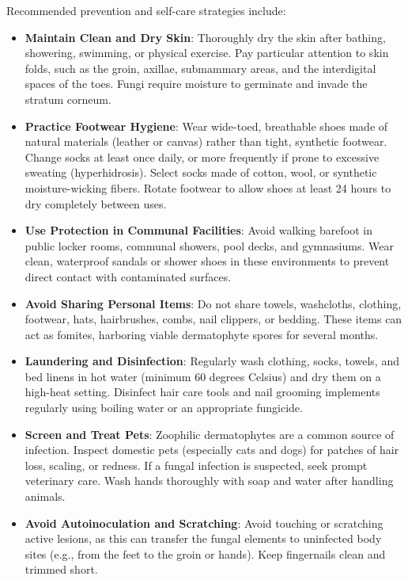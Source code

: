 Recommended prevention and self-care strategies include:
\begin{itemize}
    \item \textbf{Maintain Clean and Dry Skin}: Thoroughly dry the skin after bathing, showering, swimming, or physical exercise. Pay particular attention to skin folds, such as the groin, axillae, submammary areas, and the interdigital spaces of the toes. Fungi require moisture to germinate and invade the stratum corneum.
    \item \textbf{Practice Footwear Hygiene}: Wear wide-toed, breathable shoes made of natural materials (leather or canvas) rather than tight, synthetic footwear. Change socks at least once daily, or more frequently if prone to excessive sweating (hyperhidrosis). Select socks made of cotton, wool, or synthetic moisture-wicking fibers. Rotate footwear to allow shoes at least 24 hours to dry completely between uses.
    \item \textbf{Use Protection in Communal Facilities}: Avoid walking barefoot in public locker rooms, communal showers, pool decks, and gymnasiums. Wear clean, waterproof sandals or shower shoes in these environments to prevent direct contact with contaminated surfaces.
    \item \textbf{Avoid Sharing Personal Items}: Do not share towels, washcloths, clothing, footwear, hats, hairbrushes, combs, nail clippers, or bedding. These items can act as fomites, harboring viable dermatophyte spores for several months.
    \item \textbf{Laundering and Disinfection}: Regularly wash clothing, socks, towels, and bed linens in hot water (minimum 60 degrees Celsius) and dry them on a high-heat setting. Disinfect hair care tools and nail grooming implements regularly using boiling water or an appropriate fungicide.
    \item \textbf{Screen and Treat Pets}: Zoophilic dermatophytes are a common source of infection. Inspect domestic pets (especially cats and dogs) for patches of hair loss, scaling, or redness. If a fungal infection is suspected, seek prompt veterinary care. Wash hands thoroughly with soap and water after handling animals.
    \item \textbf{Avoid Autoinoculation and Scratching}: Avoid touching or scratching active lesions, as this can transfer the fungal elements to uninfected body sites (e.g., from the feet to the groin or hands). Keep fingernails clean and trimmed short.
\end{itemize}

